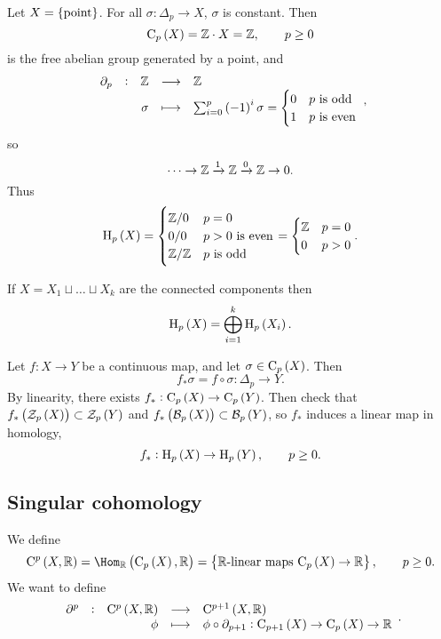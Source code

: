 \pagebreak

\begin{example}
Let $ X = \cbr{\text{point}} $. For all $ \sigma : \Delta_p \to X $, $ \sigma $ is constant. Then
$$ \C_p\br{X} = \ZZ \cdot X = \ZZ, \qquad p \ge 0 $$
is the free abelian group generated by a point, and
$$ \function[\partial_p]{\ZZ}{\ZZ}{\sigma}{\sum_{i = 0}^p \br{-1}^i\sigma =
\begin{cases}
0 & p \ \text{is odd} \\
1 & p \ \text{is even}
\end{cases}
}, $$
so
$$ \dots \to \mathbb{Z} \xrightarrow{1} \mathbb{Z} \xrightarrow{0} \mathbb{Z} \to 0. $$
Thus
$$ \H_p\br{X} =
\begin{cases}
\ZZ / 0 & p = 0 \\
0 / 0 & p > 0 \ \text{is even} \\
\ZZ / \ZZ & p \ \text{is odd}
\end{cases}
=
\begin{cases}
\ZZ & p = 0 \\
0 & p > 0
\end{cases}.
$$
\end{example}

\begin{exercise*}
If $ X = X_1 \sqcup \dots \sqcup X_k $ are the connected components then
$$ \H_p\br{X} = \bigoplus_{i = 1}^k \H_p\br{X_i}. $$
\end{exercise*}

\begin{exercise*}
Let $ f : X \to Y $ be a continuous map, and let $ \sigma \in \C_p\br{X} $. Then
$$ f_*\sigma = f \circ \sigma : \Delta_p \to Y. $$
By linearity, there exists $ f_* : \C_p\br{X} \to \C_p\br{Y} $. Then check that $ f_*\br{\ZZZ_p\br{X}} \subset \ZZZ_p\br{Y} $ and $ f_*\br{\BBB_p\br{X}} \subset \BBB_p\br{Y} $, so $ f_* $ induces a linear map in homology,
$$ f_* : \H_p\br{X} \to \H_p\br{Y}, \qquad p \ge 0. $$
\end{exercise*}

\subsection{Singular cohomology}

We define
$$ \C^p\br{X, \RR} = \Hom_\RR\br{\C_p\br{X}, \RR} = \cbr{\text{$ \RR $-linear maps} \ \C_p\br{X} \to \RR}, \qquad p \ge 0. $$
We want to define
$$ \function[\partial^p]{\C^p\br{X, \RR}}{\C^{p + 1}\br{X, \RR}}{\phi}{\phi \circ \partial_{p + 1} : \C_{p + 1}\br{X} \to \C_p\br{X} \to \RR}. $$

